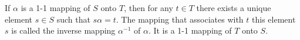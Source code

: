 If $\alpha$ is a 1-1 mapping of $S$ onto $T$, then for any $t \in T$ there exists a unique element $s \in S$ such that $s\alpha = t$. The mapping that associates with $t$ this element $s$ is called the inverse mapping $\alpha^{-1}$ of $\alpha$. It is a 1-1 mapping of $T$ onto $S$.
